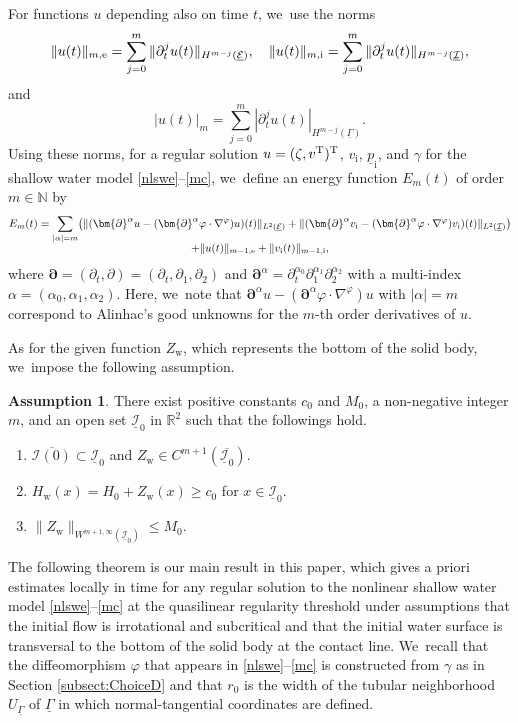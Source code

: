 \documentclass[10pt]{amsart}
\newenvironment{enumeratei}
{\bgroup\def\theenumi{\roman{enumi}}\def\theenumii{\arabic{enumii}}\begin{enumerate}}
{\end{enumerate}\egroup}
\newcommand{\R}{{\mathbb R}}
\newcommand{\dt}{\partial_t}
\newcommand{\cI}{{\mathcal I}}
\newcommand{\cE}{{\mathcal E}}
\newcommand{\ul}[1]{\underline{#1}}
\newcommand{\itGamma}{\mathit{\Gamma}}
\theoremstyle{definition}
\newtheorem{assumption}[theorem]{Assumption}
\begin{document}
For functions $u$ depending also on time $t$, we~use the norms
\[
\|u(t)\|_{m,{\rm e}}=\sum_{j=0}^m \|\dt^j u (t)\|_{H^{m-j}(\ul{\cE})}, \quad
\|u(t)\|_{m,{\rm i}}=\sum_{j=0}^m \|\dt^j u (t)\|_{H^{m-j}(\ul{\cI})},
\]
and
\[
|u(t)|_m = \sum_{j=0}^m |\dt^j u(t)|_{H^{m-j}(\ul{\itGamma})}.
\]
Using these norms, for a regular solution $u=(\zeta,v^{\rm T})^{\rm T}$, $v_\mathrm{i}$, $\ul{p}_\mathrm{i}$, and $\gamma$ for the shallow water model
\eqref{nlswe}--\eqref{mc}, we~define an energy function $E_m(t)$ of order $m\in\mathbb{N}$ by
\begin{multline*}
E_m(t)
= \sum_{|\alpha|=m} \bigl(\|(\bm{\partial}^\alpha u-(\bm{\partial}^\alpha\varphi\cdot\nabla^\varphi)u)(t)\|_{L^2(\ul{\cE})}
+ \|(\bm{\partial}^\alpha v_\mathrm{i}-(\bm{\partial}^\alpha\varphi\cdot\nabla^\varphi)v_\mathrm{i})(t)\|_{L^2(\ul{\cI})} \bigr) \\[-5pt]
+ \|u(t)\|_{m-1,{\rm e}} + \|v_\mathrm{i}(t)\|_{m-1,{\rm i}},
\end{multline*}
where $\bm{\partial}=(\dt,\partial)=(\dt,\partial_1,\partial_2)$ and $\bm{\partial}^\alpha=\dt^{\alpha_0}\partial_1^{\alpha_1}\partial_2^{\alpha_2}$
with a multi-index $\alpha=(\alpha_0,\alpha_1,\alpha_2)$.
Here, we~note that $\bm{\partial}^\alpha u-(\bm{\partial}^\alpha\varphi\cdot\nabla^\varphi)u$ with $|\alpha|=m$ correspond to Alinhac's good unknowns
for the $m$-th order derivatives of $u$.

As for the given function $Z_\mathrm{w}$, which represents the bottom of the solid body, we~impose the following assumption.

\begin{assumption}\label{ass:BSB}
There exist positive constants $c_0$ and $M_0$, a non-negative integer $m$, and an open set $\ul{\cI}_{0}$ in $\R^2$ such that the followings hold.
\begin{enumeratei}
\item\label{ass:BSBi}
$\overline{\cI(0)}\subset\ul{\cI}_{0}$ and $Z_\mathrm{w} \in C^{m+1}(\overline{\ul{\cI}_0})$.
\item\label{ass:BSBii}
$H_\mathrm{w}(x)=H_0+Z_\mathrm{w}(x) \geq c_0$ for $x\in\ul{\cI}_0$.
\item\label{ass:BSBiii}
$\|Z_\mathrm{w}\|_{W^{m+1,\infty}(\ul{\cI}_0)} \leq M_0$.
\end{enumeratei}
\end{assumption}

The following theorem is our main result in this paper, which gives a priori estimates locally in time for any regular solution to the nonlinear shallow water model
\eqref{nlswe}--\eqref{mc} at the quasilinear regularity threshold under assumptions that the initial flow is irrotational and subcritical
and that the initial water surface is transversal to the bottom of the solid body at the contact line. We~recall that the diffeomorphism $\varphi$ that appears in \eqref{nlswe}--\eqref{mc} is constructed from $\gamma$ as in Section \ref{subsect:ChoiceD}
and that $r_0$ is the width of the tubular neighborhood $U_{\ul{\itGamma}}$ of $\ul{\itGamma}$ in which normal-tangential coordinates are defined.
\end{document}
